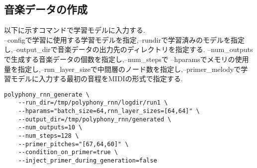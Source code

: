 \subsection{音楽データの作成}
以下に示すコマンドで学習モデルに入力する.\\
--configで学習に使用する学習モデルを指定,--rundirで学習済みのモデルを指定し,--output\_dirで音楽データの出力先のディレクトリを指定する.
--num\_outputsで生成する音楽データの個数を指定し,--num\_stepsで
--hparamsでメモリの使用量を指定し,--rnn\_layer\_sizeで中間層のノード数を指定し,--primer\_melodyで学習モデルに入力する最初の音程をMIDIの形式で指定する.\\
\begin{lstlisting}[basicstyle=\ttfamily\footnotesize,frame=single]
    polyphony_rnn_generate \
    --run_dir=/tmp/polyphony_rnn/logdir/run1 \
    --hparams="batch_size=64,rnn_layer_sizes=[64,64]" \
    --output_dir=/tmp/polyphony_rnn/generated \
    --num_outputs=10 \
    --num_steps=128 \
    --primer_pitches="[67,64,60]" \
    --condition_on_primer=true \
    --inject_primer_during_generation=false
\end{lstlisting}
